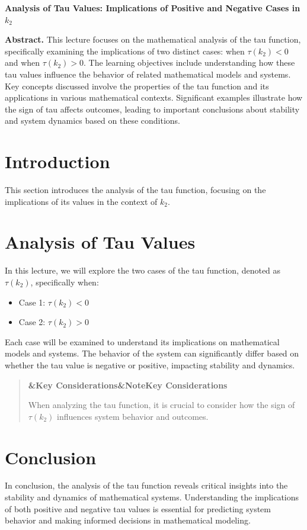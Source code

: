 \documentclass[a4paper]{article}
\newcommand{\boxheading}[1]{%
  \par\smallskip
  \noindent\textbf{\ifx&#1&Note\else#1\fi}\par
  \smallskip
}
\newenvironment{rembox}[1][]{%
  \begin{quote}\color{black!70}\boxheading{#1}\normalcolor
}{\end{quote}}
\begin{document}
\begin{center}
{\LARGE \textbf{Analysis of Tau Values: Implications of Positive and Negative Cases in \( k_2 \)}}\\[1em]
\end{center}

\textbf{Abstract.} This lecture focuses on the mathematical analysis of the tau function, specifically examining the implications of two distinct cases: when \( \tau(k_2) < 0 \) and when \( \tau(k_2) > 0 \). The learning objectives include understanding how these tau values influence the behavior of related mathematical models and systems. Key concepts discussed involve the properties of the tau function and its applications in various mathematical contexts. Significant examples illustrate how the sign of tau affects outcomes, leading to important conclusions about stability and system dynamics based on these conditions.

\section{Introduction}
This section introduces the analysis of the tau function, focusing on the implications of its values in the context of \( k_2 \).

\section{Analysis of Tau Values}
In this lecture, we will explore the two cases of the tau function, denoted as \( \tau(k_2) \), specifically when:

\begin{itemize}
    \item Case 1: \( \tau(k_2) < 0 \)
    \item Case 2: \( \tau(k_2) > 0 \)
\end{itemize}

Each case will be examined to understand its implications on mathematical models and systems. The behavior of the system can significantly differ based on whether the tau value is negative or positive, impacting stability and dynamics. 

\begin{rembox}[Key Considerations]
When analyzing the tau function, it is crucial to consider how the sign of \( \tau(k_2) \) influences system behavior and outcomes.
\end{rembox}

\section{Conclusion}
In conclusion, the analysis of the tau function reveals critical insights into the stability and dynamics of mathematical systems. Understanding the implications of both positive and negative tau values is essential for predicting system behavior and making informed decisions in mathematical modeling.
\end{document}
